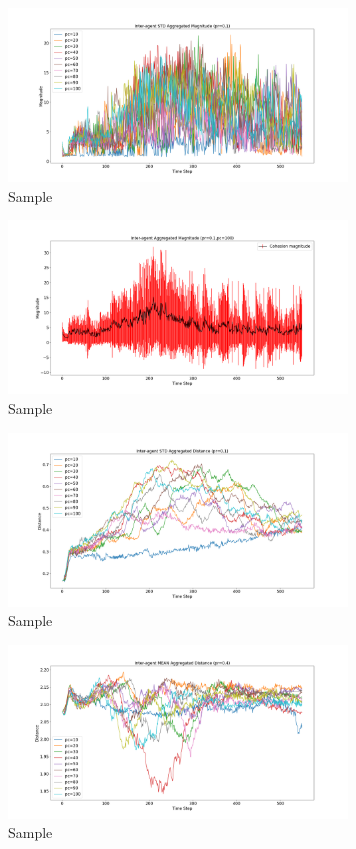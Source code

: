 \documentclass[12pt,a4paper]{IEEEtran}
\begin{document}
\begin{figure}[H]
	\begin{center}
		\includegraphics[width=9cm]{figures/Figure_6}
	\end{center}
	\caption{Sample}
\end{figure}
\begin{figure}[H]
	\begin{center}
		\includegraphics[width=9cm]{figures/Figure_7}
	\end{center}
	\caption{Sample}
\end{figure}
\begin{figure}[H]
	\begin{center}
		\includegraphics[width=9cm]{figures/Figure_8}
	\end{center}
	\caption{Sample}
\end{figure}
\begin{figure}[H]
	\begin{center}
		\includegraphics[width=9cm]{figures/Figure_9}
	\end{center}
	\caption{Sample}
\end{figure}
\end{document}
